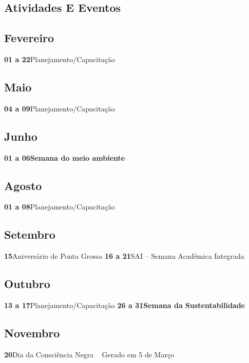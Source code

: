 \documentclass[thesis]{hmcposter}
\begin{document}
\begin{poster}
\normalsize \section{\color{hmcorange}Atividades E Eventos}\subsection{Fevereiro}\textbf{01 a 22}\quad \quad Planejamento/Capacitação \newline\subsection{Maio}\textbf{04 a 09}\quad \quad Planejamento/Capacitação \newline\subsection{Junho}\textbf{01 a 06}\quad \quad \textbf{Semana do meio ambiente} \newline\subsection{Agosto}\textbf{01 a 08}\quad \quad Planejamento/Capacitação \newline\subsection{Setembro}\textbf{15}\quad \quad \quad \quad Aniversário de Ponta Grossa \newline\textbf{16 a 21}\quad \quad SAI – Semana Acadêmica Integrada \newline\subsection{Outubro}\textbf{13 a 17}\quad \quad Planejamento/Capacitação \newline\textbf{26 a 31}\quad \quad \textbf{Semana da Sustentabilidade} \newline\subsection{Novembro}\textbf{20}\quad \quad \quad \quad Dia da Consciência Negra \newline ~ \vfill \hfill \small \color{hmcorange}Gerado em 5 de Março \end{poster}
\end{document}
